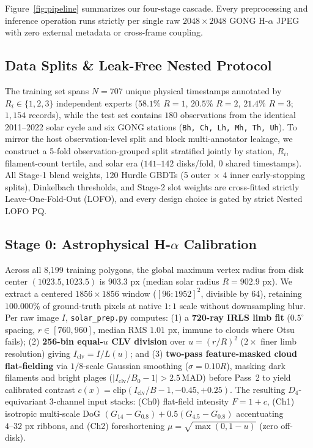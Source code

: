 \documentclass[sigconf]{acmart}
\begin{document}
Figure~\ref{fig:pipeline} summarizes our four-stage cascade. Every preprocessing and inference operation runs strictly per single raw $2048\times 2048$ GONG H-$\alpha$ JPEG with zero external metadata or cross-frame coupling.

\subsection{Data Splits \& Leak-Free Nested Protocol}
The training set spans $N=707$ unique physical timestamps annotated by $R_i \in \{1, 2, 3\}$ independent experts ($58.1\%$ $R{=}1$, $20.5\%$ $R{=}2$, $21.4\%$ $R{=}3$; $1,154$ records), while the test set contains $180$ observations from the identical 2011--2022 solar cycle and six GONG stations (\texttt{Bh, Ch, Lh, Mh, Th, Uh}). To mirror the host observation-level split and block multi-annotator leakage, we construct a 5-fold observation-grouped split stratified jointly by station, $R_i$, filament-count tertile, and solar era ($141\text{--}142$ disks/fold, $0$ shared timestamps). All Stage-1 blend weights, 120 Hurdle GBDTs (5 outer $\times$ 4 inner early-stopping splits), Dinkelbach thresholds, and Stage-2 slot weights are cross-fitted strictly Leave-One-Fold-Out (LOFO), and every design choice is gated by strict Nested LOFO PQ.

\subsection{Stage 0: Astrophysical H-$\alpha$ Calibration}
Across all 8,199 training polygons, the global maximum vertex radius from disk center $(1023.5, 1023.5)$ is $903.3\text{ px}$ (median solar radius $R=902.9\text{ px}$). We extract a centered $1856\times 1856$ window ($[96{:}1952]^2$, divisible by 64), retaining $100.000\%$ of ground-truth pixels at native $1{:}1$ scale without downsampling blur. Per raw image $I$, \texttt{solar\_prep.py} computes: (1) a \textbf{720-ray IRLS limb fit} ($0.5^\circ$ spacing, $r\in[760,960]$, median RMS $1.01\text{ px}$, immune to clouds where Otsu fails); (2) \textbf{256-bin equal-$u$ CLV division} over $u=(r/R)^2$ ($2\times$ finer limb resolution) giving $I_{\text{clv}}=I/L(u)$; and (3) \textbf{two-pass feature-masked cloud flat-fielding} via $1/8$-scale Gaussian smoothing ($\sigma=0.10R$), masking dark filaments and bright plages ($|I_{\text{clv}}/B_0-1|>2.5\,\text{MAD}$) before Pass~2 to yield calibrated contrast $c(x)=\mathrm{clip}(I_{\text{clv}}/B-1,-0.45,+0.25)$. The resulting $D_4$-equivariant 3-channel input stacks: (Ch0) flat-field intensity $F=1+c$, (Ch1) isotropic multi-scale DoG $(G_{14}-G_{0.8})+0.5(G_{4.5}-G_{0.8})$ accentuating $4\text{--}32\text{ px}$ ribbons, and (Ch2) foreshortening $\mu=\sqrt{\max(0,1-u)}$ (zero off-disk).
\end{document}
